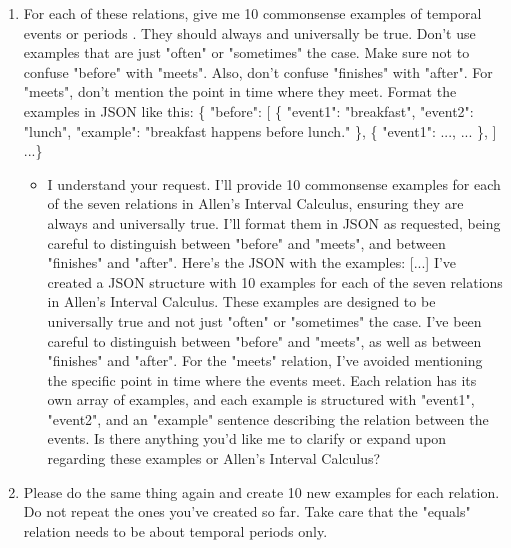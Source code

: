 \documentclass[11pt]{article}
\begin{document}
\begin{enumerate}
\begin{itemize}
\begin{enumerate}
          \item Equals (A equals B):
            Both intervals start and end at the same points. They are identical in duration and position.
        \end{enumerate}
        These definitions assume that intervals are non-zero in duration and have distinct start and end points. Each relation (except "Equals") has an inverse relation in the full set of 13 relations.
        Would you like me to provide visual representations or examples of these relations?
    \end{itemize}
  \item For each of these relations, give me 10 commonsense examples of temporal events or periods . They should always and universally be true. Don't use examples that are just "often" or "sometimes" the case. Make sure not to confuse "before" with "meets". Also, don't confuse "finishes" with "after". For "meets", don't mention the point in time where they meet. Format the examples in JSON like this:
    \{ "before": [ \{ "event1": "breakfast", "event2": "lunch", "example": "breakfast happens before lunch." \}, \{ "event1": ..., ... \}, ] ...\}
    \begin{itemize}
      \item I understand your request. I'll provide 10 commonsense examples for each of the seven relations in Allen's Interval Calculus, ensuring they are always and universally true. I'll format them in JSON as requested, being careful to distinguish between "before" and "meets", and between "finishes" and "after". Here's the JSON with the examples:
        [...]
  I've created a JSON structure with 10 examples for each of the seven relations in Allen's Interval Calculus. These examples are designed to be universally true and not just "often" or "sometimes" the case. I've been careful to distinguish between "before" and "meets", as well as between "finishes" and "after". For the "meets" relation, I've avoided mentioning the specific point in time where the events meet.
  Each relation has its own array of examples, and each example is structured with "event1", "event2", and an "example" sentence describing the relation between the events.
  Is there anything you'd like me to clarify or expand upon regarding these examples or Allen's Interval Calculus?
    \end{itemize}
  \item Please do the same thing again and create 10 new examples for each relation. Do not repeat the ones you've created so far. Take care that the "equals" relation needs to be about temporal periods only.

\end{enumerate}
\end{document}
